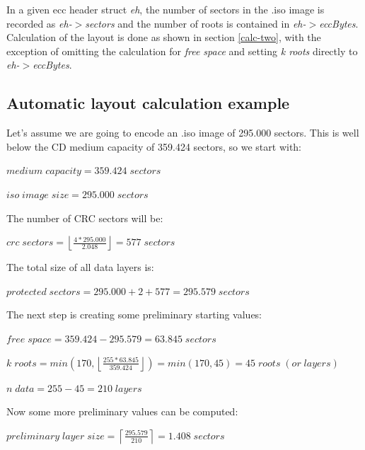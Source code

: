 In a given ecc header struct {\em eh}, the number of sectors in the .iso
image is recorded as \mbox{\em eh-$>$sectors} 
and the number of roots is contained in \mbox{\em eh-$>$eccBytes}.
Calculation of the layout is done as shown in section \ref{calc-two}, 
with the exception of omitting the calculation for {\em free space} and
setting {\em k roots} directly to  \mbox{\em eh-$>$eccBytes}.

\subsection{Automatic layout calculation example}
\label{example-two}

Let's assume we are going to encode an .iso image of 295.000 sectors.
This is well below the CD medium capacity of 359.424 sectors, so we
start with:

\smallskip

$medium\; capacity = 359.424\; sectors$

$iso\; image\; size = 295.000\; sectors$

\medskip

The number of CRC sectors will be:

\smallskip

$crc\; sectors = \left\lfloor\frac{4 * 295.000}{2.048}\right\rfloor = 577\; sectors$

\medskip

The total size of all data layers is:

$protected\; sectors = 295.000 + 2 + 577 = 295.579\; sectors$

\bigskip

The next step is creating some preliminary starting values:

\smallskip

$free\; space = 359.424 - 295.579 = 63.845\; sectors$

\smallskip

$k\; roots = min\left(170, \left\lfloor\frac{255* 63.845}{359.424}\right\rfloor\right) = min(170, 45) = 45\; roots\; (or\; layers)$

\smallskip

$n\; data = 255 - 45 = 210\; layers$

\bigskip

Now some more preliminary values can be computed:

\smallskip

$preliminary\; layer\; size = \left\lceil\frac{295.579}{210}\right\rceil = 1.408\; sectors$

